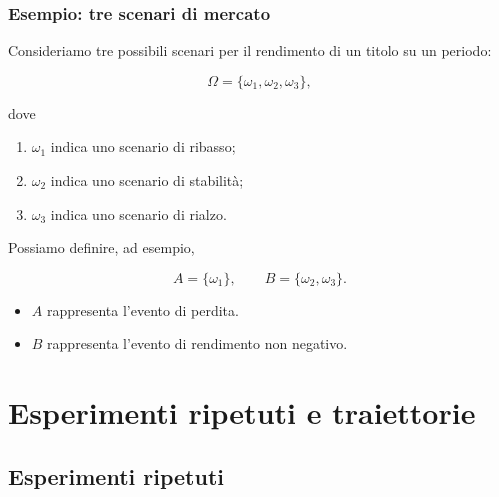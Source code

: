 \documentclass[handout]{beamer}%
\newenvironment{stepenumerate}{\begin{enumerate}[<+->]}{\end{enumerate}}
\newenvironment{stepitemize}{\begin{itemize}[<+->]}{\end{itemize} }
\providecommand{\1}{\mathbf{1}}
\providecommand{\QTR}[2]{\csname #1\endcsname{#2}}
\begin{document}
\begin{frame}%
%

\frametitle{Esempio: tre scenari di mercato}%


Consideriamo tre possibili scenari per il rendimento di un titolo su un periodo:%

\[
\Omega=\{\omega_{1},\omega_{2},\omega_{3}\},
\]


dove

\begin{stepenumerate}
\item[1.] $\omega_{1}$ indica uno scenario di ribasso;

\item[2.] $\omega_{2}$ indica uno scenario di stabilit\`{a};

\item[3.] $\omega_{3}$ indica uno scenario di rialzo.
\end{stepenumerate}

\medskip

Possiamo definire, ad esempio,%

\[
A=\{\omega_{1}\}, \qquad B=\{\omega_{2},\omega_{3}\}.
\]


\begin{stepitemize}


\item $A$ rappresenta l'evento di perdita.

\item $B$ rappresenta l'evento di rendimento non negativo.
\end{stepitemize}%

\transboxout
\end{frame}%




\section{Esperimenti ripetuti e traiettorie}

\subsection{Esperimenti ripetuti}%
\end{document}
